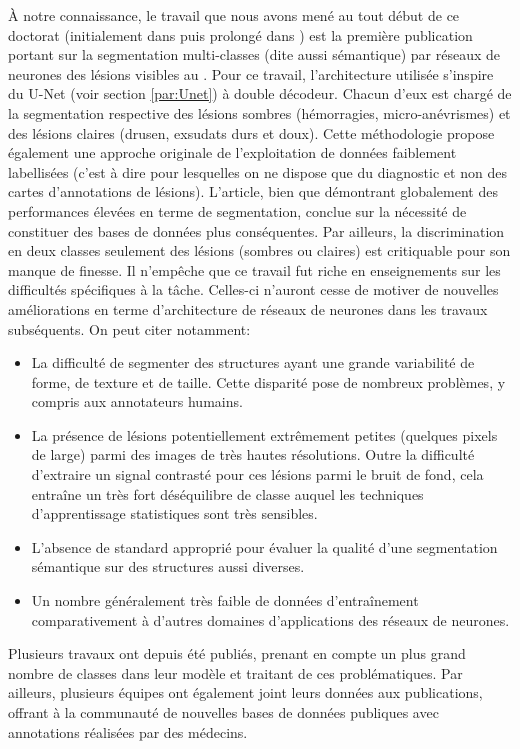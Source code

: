 À notre connaissance, le travail que nous avons mené au tout début de ce doctorat (initialement dans \cite{playoutMultitaskLearningArchitecture2018} puis prolongé dans \cite{playoutNovelWeaklySupervised2019}) est la première publication portant sur la segmentation multi-classes (dite aussi sémantique) par réseaux de neurones des lésions visibles au \fundus{}. Pour ce travail, l'architecture utilisée s'inspire du U-Net (voir section \ref{par:Unet}) à double décodeur. Chacun d'eux est chargé de la segmentation respective des lésions sombres (hémorragies, micro-anévrismes) et des lésions claires (drusen, exsudats durs et doux). Cette méthodologie propose également une approche originale de l'exploitation de données faiblement labellisées (c'est à dire pour lesquelles on ne dispose que du diagnostic et non des cartes d'annotations de lésions). L'article, bien que démontrant globalement des performances élevées en terme de segmentation, conclue sur la nécessité de constituer des bases de données plus conséquentes. Par ailleurs, la discrimination en deux classes seulement des lésions (sombres ou claires) est critiquable pour son manque de finesse. Il n'empêche que ce travail fut riche en enseignements sur les difficultés spécifiques à la tâche. Celles-ci n'auront cesse de motiver de nouvelles améliorations en terme d'architecture de réseaux de neurones dans les travaux subséquents. On peut citer notamment:
\begin{itemize}
	\item La difficulté de segmenter des structures ayant une grande variabilité de forme, de texture et de taille. Cette disparité pose de nombreux problèmes, y compris aux annotateurs humains.
	\item La présence de lésions potentiellement extrêmement petites (quelques pixels de large) parmi des images de très hautes résolutions. Outre la difficulté d'extraire un signal contrasté pour ces lésions parmi le bruit de fond, cela entraîne un très fort déséquilibre de classe auquel les techniques d'apprentissage statistiques sont très sensibles.
	\item L'absence de standard approprié pour évaluer la qualité d'une segmentation sémantique sur des structures aussi diverses.
	\item Un nombre généralement très faible de données d'entraînement comparativement à d'autres domaines d'applications des réseaux de neurones.
\end{itemize}
Plusieurs travaux ont depuis été publiés, prenant en compte un plus grand nombre de classes dans leur modèle et traitant de ces problématiques. Par ailleurs, plusieurs équipes ont également joint leurs données aux publications, offrant à la communauté de nouvelles bases de données publiques avec annotations réalisées par des médecins.
